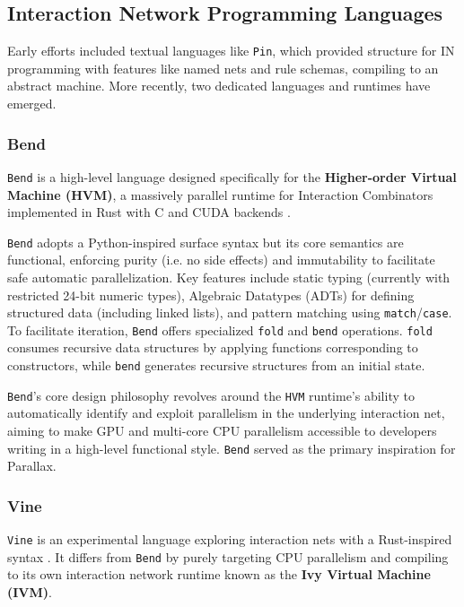 \subsection{Interaction Network Programming Languages}

Early efforts included textual languages like \texttt{Pin}, which provided structure for IN programming with features like named nets and rule schemas, compiling to an abstract machine. More recently, two dedicated languages and runtimes have emerged.

\subsubsection{Bend}

\texttt{Bend} is a high-level language designed specifically for the \textbf{Higher-order Virtual Machine (HVM)}, a massively parallel runtime for Interaction Combinators implemented in Rust with C and CUDA backends \cite{BendGithub}.

\texttt{Bend} adopts a Python-inspired surface syntax but its core semantics are functional, enforcing purity (i.e. no side effects) and immutability to facilitate safe automatic parallelization. Key features include static typing (currently with restricted 24-bit numeric types), Algebraic Datatypes (ADTs) for defining structured data (including linked lists), and pattern matching using \texttt{match}/\texttt{case}. To facilitate iteration, \texttt{Bend} offers specialized \texttt{fold} and \texttt{bend} operations. \texttt{fold} consumes recursive data structures by applying functions corresponding to constructors, while \texttt{bend} generates recursive structures from an initial state.

\texttt{Bend}'s core design philosophy revolves around the \texttt{HVM} runtime's ability to automatically identify and exploit parallelism in the underlying interaction net, aiming to make GPU and multi-core CPU parallelism accessible to developers writing in a high-level functional style. \texttt{Bend} served as the primary inspiration for Parallax.

\subsubsection{Vine}

\texttt{Vine} is an experimental language exploring interaction nets with a Rust-inspired syntax \cite{VineGithub}. It differs from \texttt{Bend} by purely targeting CPU parallelism and compiling to its own interaction network runtime known as the \textbf{Ivy Virtual Machine (IVM)}.

